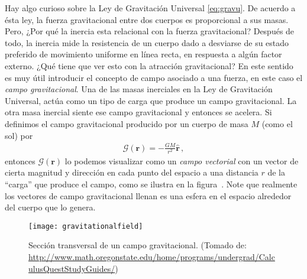 Hay algo curioso sobre la Ley de Gravitación Universal \eqref{eq:gravu}. 
De acuerdo a ésta ley, la fuerza gravitacional entre dos cuerpos es proporcional a sus masas. 
Pero, ¿Por qué la inercia esta relacional con la fuerza gravitacional?
Después de todo, la inercia mide la resistencia de un cuerpo dado a desviarse de su estado preferido de movimiento uniforme en línea recta, en respuesta a algún factor externo. ¿Qué tiene que ver esto con la atracción gravitacional?
En este sentido es muy útil introducir el concepto de campo asociado a una fuerza, en este caso el \emph{campo gravitacional}. Una de las masas inerciales en la Ley de Gravitación Universal, actúa como un tipo de carga que produce un campo gravitacional. 
La otra masa inercial siente ese campo gravitacional y entonces se acelera. Si definimos el campo gravitacional producido por un cuerpo de masa $M$ (como el sol) por
\begin{align}
\boldsymbol{\mathcal{G}}(\mathbf{r})=-\frac{GM}{r^2}\hat{\mathbf{r}}\,,
\end{align}
entonces $\boldsymbol{\mathcal{G}}(\mathbf{r})$ lo podemos visualizar como un \emph{campo vectorial} con un vector de cierta magnitud y dirección en cada punto del espacio a una distancia $r$ de la ``carga'' que produce el campo, como se ilustra en la figura~\cite{fig:graviatationalfield}.
Note que realmente los vectores de campo gravitacional llenan es una esfera en el espacio alrededor del cuerpo que lo genera. 

\begin{frame}
  \begin{figure}
    \centering
    \texttt{[image: gravitationalfield]}
    \caption{Sección transversal de un campo gravitacional. (Tomado de: \url{http://www.math.oregonstate.edu/home/programs/undergrad/CalculusQuestStudyGuides/})}
    \label{fig:gravitationalfield}
  \end{figure}
\end{frame}

